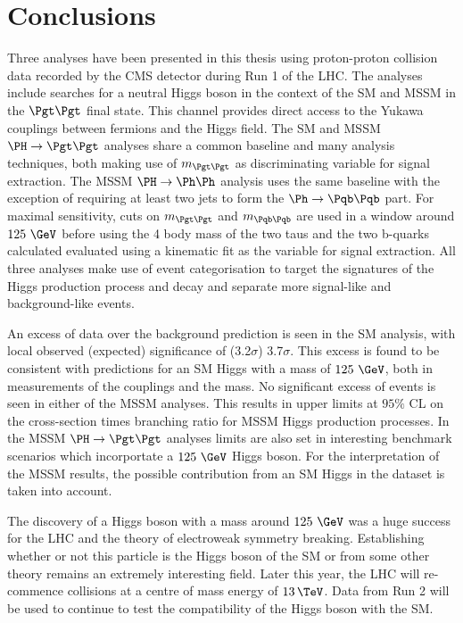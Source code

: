 \chapter{Conclusions}
\label{chap:conclusion}

Three analyses have been presented in this thesis using proton-proton collision
data recorded by the CMS detector during Run 1 of the LHC. The analyses include
searches for a neutral Higgs boson in the context of the \ac{SM} and \ac{MSSM}
in the $\Pgt\Pgt$ final state. This channel provides direct access to the Yukawa
couplings between fermions and the Higgs field. The \ac{SM} and \ac{MSSM}
$\PH\to\Pgt\Pgt$ analyses share a common baseline and many analysis techniques,
both making use of $m_{\Pgt\Pgt}$ as discriminating variable for signal
extraction. The \ac{MSSM} $\PH\to\Ph\Ph$ analysis uses the same baseline with
the exception of requiring at least two jets to form the $\Ph\to\Pqb\Pqb$ part.
For maximal sensitivity, cuts on $m_{\Pgt\Pgt}$ and $m_{\Pqb\Pqb}$ are used in a
window around $125~\GeV$ before using the 4 body mass of the two taus and the 
two b-quarks calculated evaluated using a kinematic fit as the variable for
signal extraction. All three analyses make use of event categorisation to target 
the signatures of the Higgs production process and decay and separate more signal-like and
background-like events.

An excess of data over the background prediction is seen in the \ac{SM}
analysis, with local observed (expected) significance of (3.2$\sigma$)
3.7$\sigma$. This excess is found to be consistent with predictions for an
\ac{SM} Higgs with a mass of $125~\GeV$, both in measurements of the
couplings and the mass. No significant excess of events is seen in either of the
\ac{MSSM} analyses. This results in upper limits at $95\%$ CL on the
cross-section times branching ratio for \ac{MSSM} Higgs production processes. In
the \ac{MSSM} $\HToTauTau$ analyses limits are also set in interesting benchmark
scenarios which incorportate a $125~\GeV$ Higgs boson. For the interpretation of
the \ac{MSSM} results, the possible contribution from an \ac{SM} Higgs in the
dataset is taken into account. 

The discovery of a Higgs boson with a mass around $125~\GeV$ was a huge success 
for the LHC and the theory of electroweak symmetry breaking. Establishing
whether or not this particle is the Higgs boson of the \ac{SM} or from some
other theory remains an extremely interesting field. Later this year, the LHC
will re-commence collisions at a centre of mass energy of $13\,\TeV$. Data from
Run 2 will be used to continue to test the compatibility of the Higgs boson with
the \ac{SM}.

